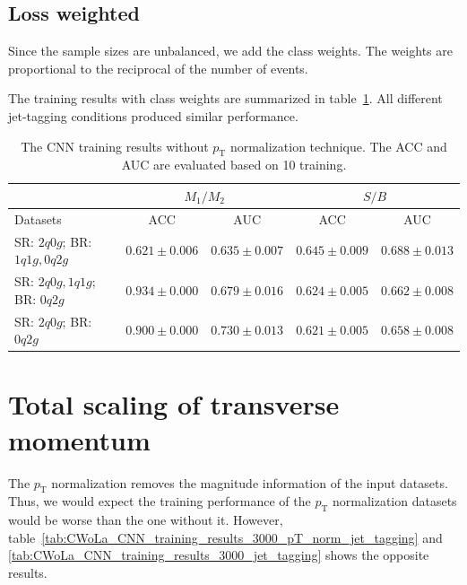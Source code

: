 \documentclass[12pt]{article}
\begin{document}
    \subsection{Loss weighted}%
    \label{sub:loss_weighted}
        Since the sample sizes are unbalanced, we add the class weights. The weights are proportional to the reciprocal of the number of events.

        The training results with class weights are summarized in table~\ref{tab:CWoLa_CNN_training_results_3000_jet_tagging_weighted_loss}. All different jet-tagging conditions produced similar performance.
    \begin{table}[htpb]
        \centering
        \caption{The CNN training results without $p_{\text{T}}$ normalization technique. The ACC and AUC are evaluated based on 10 training.}
        \label{tab:CWoLa_CNN_training_results_3000_jet_tagging_weighted_loss}
        \begin{tabular}{l|cc|cc}
                                         & \multicolumn{2}{c|}{$M_1 / M_2$}      & \multicolumn{2}{c}{$S / B$}           \\ \hline
            Datasets                     & ACC               & AUC               & ACC               & AUC               \\ \hline
            SR: $2q0g$; BR: $1q1g, 0q2g$ & $0.621 \pm 0.006$ & $0.635 \pm 0.007$ & $0.645 \pm 0.009$ & $0.688 \pm 0.013$ \\
            SR: $2q0g, 1q1g$; BR: $0q2g$ & $0.934 \pm 0.000$ & $0.679 \pm 0.016$ & $0.624 \pm 0.005$ & $0.662 \pm 0.008$ \\
            SR: $2q0g$; BR: $0q2g$       & $0.900 \pm 0.000$ & $0.730 \pm 0.013$ & $0.621 \pm 0.005$ & $0.658 \pm 0.008$
        \end{tabular}
    \end{table}
\section{Total scaling of transverse momentum}%
\label{sec:total_scaling_of_transverse_momentum}
    The $p_{\text{T}}$ normalization removes the magnitude information of the input datasets. Thus, we would expect the training performance of the $p_{\text{T}}$ normalization datasets would be worse than the one without it. However, table~\ref{tab:CWoLa_CNN_training_results_3000_pT_norm_jet_tagging} and \ref{tab:CWoLa_CNN_training_results_3000_jet_tagging} shows the opposite results.
\end{document}
